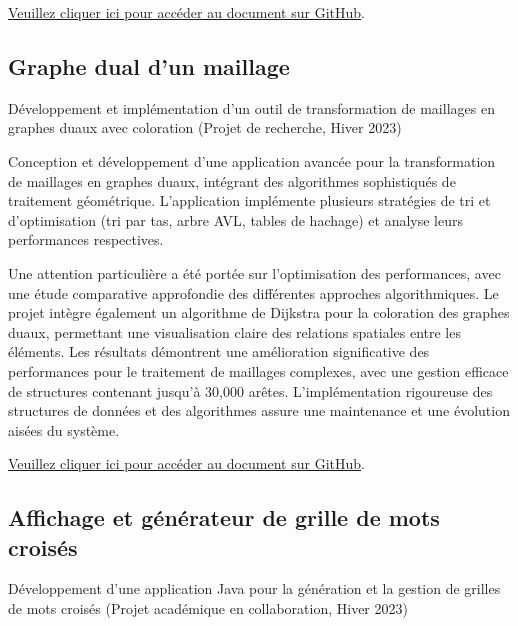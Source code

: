 \documentclass{article}
\begin{document}
    \href{https://github.com/jafarizadeh/CV---lettre/tree/2c50806438650ea894402f5cec3c73276cccaadc/Document/Projets/Maze%20Generation%20and%20Resolution}{Veuillez cliquer ici pour accéder au document sur GitHub}.
    
    \newpage

    \subsection{Graphe dual d’un maillage}

    Développement et implémentation d'un outil de transformation de maillages en graphes duaux avec coloration (Projet de recherche, Hiver 2023)

    Conception et développement d'une application avancée pour la transformation de maillages en graphes duaux, intégrant des algorithmes sophistiqués de traitement géométrique. L'application implémente plusieurs stratégies de tri et d'optimisation (tri par tas, arbre AVL, tables de hachage) et analyse leurs performances respectives.
    
    Une attention particulière a été portée sur l'optimisation des performances, avec une étude comparative approfondie des différentes approches algorithmiques. Le projet intègre également un algorithme de Dijkstra pour la coloration des graphes duaux, permettant une visualisation claire des relations spatiales entre les éléments. Les résultats démontrent une amélioration significative des performances pour le traitement de maillages complexes, avec une gestion efficace de structures contenant jusqu'à 30,000 arêtes. L'implémentation rigoureuse des structures de données et des algorithmes assure une maintenance et une évolution aisées du système.
    \newline
    \newline
    \newline

    \href{https://github.com/jafarizadeh/CV---lettre/tree/2c50806438650ea894402f5cec3c73276cccaadc/Document/Projets/Dual%20Graph%20of%20a%20Mesh}{Veuillez cliquer ici pour accéder au document sur GitHub}.
    \newpage


    \subsection{Affichage et générateur de grille de mots croisés}

    Développement d'une application Java pour la génération et la gestion de grilles de mots croisés (Projet académique en collaboration, Hiver 2023)
\end{document}
